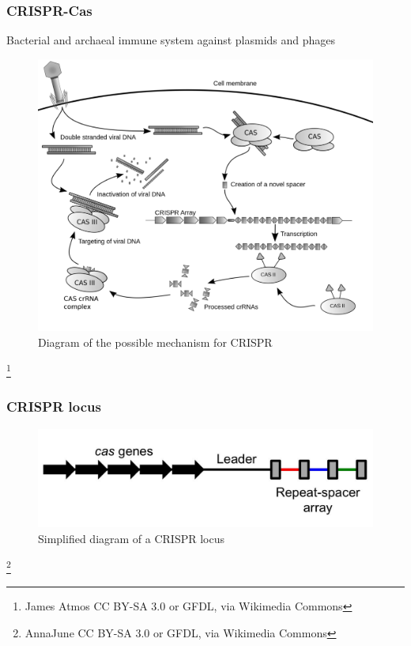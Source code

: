\documentclass[10pt]{beamer}
\begin{document}
\begin{frame}[fragile]
  \frametitle{CRISPR-Cas}
  
  Bacterial and archaeal immune system against plasmids and phages
  \begin{figure}
  \includegraphics[width=\textwidth,height=0.6\textheight,keepaspectratio]{1024px-Crispr.png}
  \caption{Diagram of the possible mechanism for CRISPR}
  \end{figure}
  \footnote{James Atmos CC BY-SA 3.0 or GFDL, via Wikimedia Commons}

\end{frame}

\begin{frame}[fragile]
	\frametitle{CRISPR locus}

  \begin{figure}
  \includegraphics[width=\textwidth,height=0.6\textheight,keepaspectratio]{1024px-SimpleCRISPR.jpg}
  \caption{Simplified diagram of a CRISPR locus}
  \end{figure}
  \footnote{AnnaJune CC BY-SA 3.0 or GFDL, via Wikimedia Commons}

\end{frame}
\end{document}
